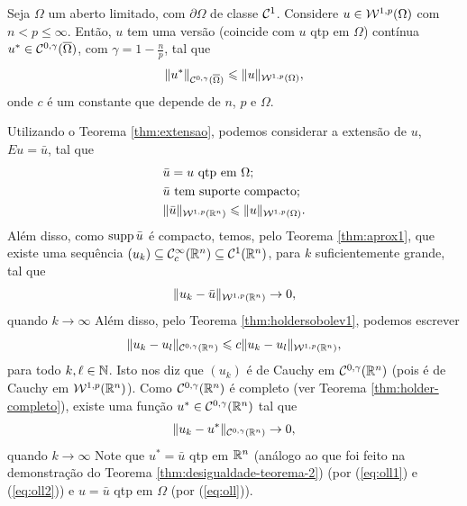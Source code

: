 \begin{tbox}
    Seja $\Omega$ um aberto limitado, com $\partial\Omega$ de classe $\mathcal{C}^1$.
    Considere $u \in \mathcal{W}^{1,p}(\Omega)$ com $n < p \leqslant \infty$.
    Então, $u$ tem uma versão (coincide com $u$ qtp em $\Omega$) contínua $u^* \in \mathcal{C}^{0,\gamma}(\overline\Omega)$, com $\gamma = 1 - \frac{n}{p}$, tal que
    \[
        \Vert u^*  \Vert_{\mathcal{C}^{0,\gamma}(\overline\Omega)} \leqslant \Vert u \Vert_{\mathcal{W}^{1,p}(\Omega)},
    \]
    onde $c$ é um constante que depende de $n$, $p$ e $\Omega$.
\end{tbox}
\begin{prf}
    Utilizando o Teorema \ref{thm:extensao}, podemos considerar a extensão de $u$, $Eu = \bar u$, tal que
    \begin{equation} \label{eq:oll}
        \begin{aligned}
            &\bar u = u \text{ qtp em } \Omega;\\
            &\bar u \text{ tem suporte compacto};\\
            &\Vert \bar u \Vert_{\mathcal{W}^{1,p}(\mathbb{R}^n)} \leqslant \Vert u \Vert_{\mathcal{W}^{1,p}(\Omega)}.
        \end{aligned}
    \end{equation}
    Além disso, como $\mathrm{supp}\, \bar u$ é compacto, temos, pelo Teorema \ref{thm:aprox1}, que existe uma sequência $(u_k) \subseteq \mathcal{C}^\infty_c(\mathbb{R}^n) \subseteq \mathcal{C}^1(\mathbb{R}^n)$, para $k$ suficientemente grande, tal que
    \begin{equation} \label{eq:oll1}
        \Vert u_k - \bar u \Vert_{\mathcal{W}^{1,p}(\mathbb{R}^n)} \to 0,
    \end{equation}
    quando $k \to \infty$
    Além disso, pelo Teorema \ref{thm:holdersobolev1}, podemos escrever
    \[
        \Vert u_k -u_l \Vert_{\mathcal{C}^{0,\gamma}(\mathbb{R}^n)} \leqslant c \Vert u_k - u_l \Vert_{\mathcal{W}^{1,p}(\mathbb{R}^n)},
    \]
    para todo $k, \ell \in \mathbb{N}$.
    Isto nos diz que $(u_k)$ é de Cauchy em $\mathcal{C}^{0,\gamma}(\mathbb{R}^n)$ (pois é de Cauchy em $\mathcal{W}^{1,p}(\mathbb{R}^n)$).
    Como $\mathcal{C}^{0,\gamma}(\mathbb{R}^n)$ é completo (ver Teorema \ref{thm:holder-completo}), existe uma função $u^* \in \mathcal{C}^{0,\gamma}(\mathbb{R}^n)$ tal que
    \begin{equation} \label{eq:oll2}
        \Vert u_k - u^* \Vert_{\mathcal{C}^{0,\gamma}(\mathbb{R}^n)} \to 0,
    \end{equation}
    quando $k \to \infty$
    Note que $u^* = \bar u$ qtp em $\mathbb{R}^n$ (análogo ao que foi feito na demonstração do Teorema \ref{thm:desigualdade-teorema-2}) (por (\ref{eq:oll1}) e (\ref{eq:oll2})) e $u = \bar u$ qtp em $\Omega$ (por (\ref{eq:oll})).

\end{prf}
